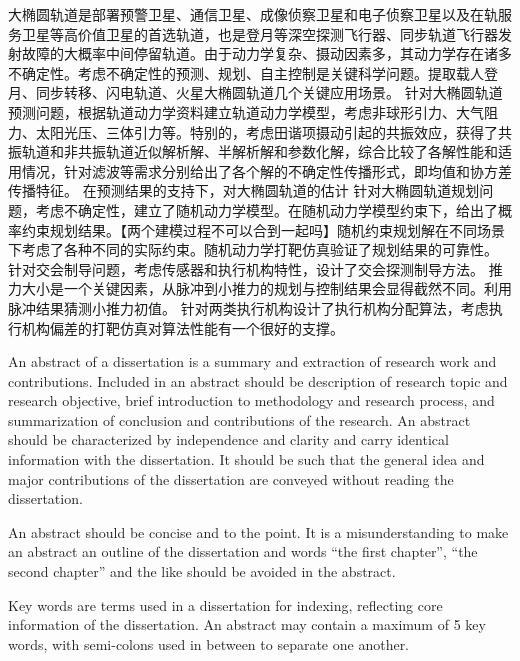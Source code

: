 \begin{cabstract}

大椭圆轨道是部署预警卫星、通信卫星、成像侦察卫星和电子侦察卫星以及在轨服务卫星等高价值卫星的首选轨道，也是登月等深空探测飞行器、同步轨道飞行器发射故障的大概率中间停留轨道。由于动力学复杂、摄动因素多，其动力学存在诸多不确定性。考虑不确定性的预测、规划、自主控制是关键科学问题。提取载人登月、同步转移、闪电轨道、火星大椭圆轨道几个关键应用场景。
针对大椭圆轨道预测问题，根据轨道动力学资料建立轨道动力学模型，考虑非球形引力、大气阻力、太阳光压、三体引力等。特别的，考虑田谐项摄动引起的共振效应，获得了共振轨道和非共振轨道近似解析解、半解析解和参数化解，综合比较了各解性能和适用情况，针对滤波等需求分别给出了各个解的不确定性传播形式，即均值和协方差传播特征。
在预测结果的支持下，对大椭圆轨道的估计
针对大椭圆轨道规划问题，考虑不确定性，建立了随机动力学模型。在随机动力学模型约束下，给出了概率约束规划结果。【两个建模过程不可以合到一起吗】随机约束规划解在不同场景下考虑了各种不同的实际约束。随机动力学打靶仿真验证了规划结果的可靠性。
针对交会制导问题，考虑传感器和执行机构特性，设计了交会探测制导方法。
推力大小是一个关键因素，从脉冲到小推力的规划与控制结果会显得截然不同。利用脉冲结果猜测小推力初值。
针对两类执行机构设计了执行机构分配算法，考虑执行机构偏差的打靶仿真对算法性能有一个很好的支撑。

\end{cabstract}

\begin{eabstract}
   An abstract of a dissertation is a summary and extraction of research work
   and contributions. Included in an abstract should be description of research
   topic and research objective, brief introduction to methodology and research
   process, and summarization of conclusion and contributions of the
   research. An abstract should be characterized by independence and clarity and
   carry identical information with the dissertation. It should be such that the
   general idea and major contributions of the dissertation are conveyed without
   reading the dissertation.

   An abstract should be concise and to the point. It is a misunderstanding to
   make an abstract an outline of the dissertation and words ``the first
   chapter'', ``the second chapter'' and the like should be avoided in the
   abstract.

   Key words are terms used in a dissertation for indexing, reflecting core
   information of the dissertation. An abstract may contain a maximum of 5 key
   words, with semi-colons used in between to separate one another.
\end{eabstract}
